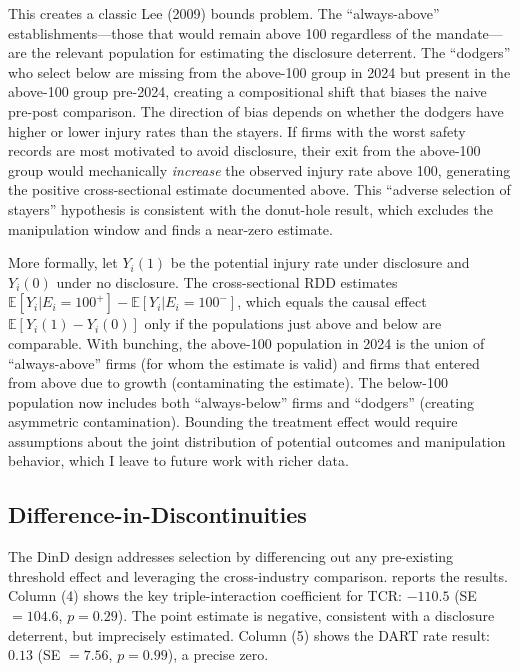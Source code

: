 \documentclass[12pt]{article}
\newcommand{\E}{\mathbb{E}}
\begin{document}
This creates a classic Lee (2009) bounds problem. The ``always-above'' establishments---those that would remain above 100 regardless of the mandate---are the relevant population for estimating the disclosure deterrent. The ``dodgers'' who select below are missing from the above-100 group in 2024 but present in the above-100 group pre-2024, creating a compositional shift that biases the naive pre-post comparison. The direction of bias depends on whether the dodgers have higher or lower injury rates than the stayers. If firms with the worst safety records are most motivated to avoid disclosure, their exit from the above-100 group would mechanically \textit{increase} the observed injury rate above 100, generating the positive cross-sectional estimate documented above. This ``adverse selection of stayers'' hypothesis is consistent with the donut-hole result, which excludes the manipulation window and finds a near-zero estimate.

More formally, let $Y_i(1)$ be the potential injury rate under disclosure and $Y_i(0)$ under no disclosure. The cross-sectional RDD estimates $\E[Y_i | E_i = 100^+] - \E[Y_i | E_i = 100^-]$, which equals the causal effect $\E[Y_i(1) - Y_i(0)]$ only if the populations just above and below are comparable. With bunching, the above-100 population in 2024 is the union of ``always-above'' firms (for whom the estimate is valid) and firms that entered from above due to growth (contaminating the estimate). The below-100 population now includes both ``always-below'' firms and ``dodgers'' (creating asymmetric contamination). Bounding the treatment effect would require assumptions about the joint distribution of potential outcomes and manipulation behavior, which I leave to future work with richer data.

\subsection{Difference-in-Discontinuities}

The DinD design addresses selection by differencing out any pre-existing threshold effect and leveraging the cross-industry comparison.  reports the results. Column (4) shows the key triple-interaction coefficient for TCR: $-110.5$ (SE $= 104.6$, $p = 0.29$). The point estimate is negative, consistent with a disclosure deterrent, but imprecisely estimated. Column (5) shows the DART rate result: $0.13$ (SE $= 7.56$, $p = 0.99$), a precise zero.


\end{document}
